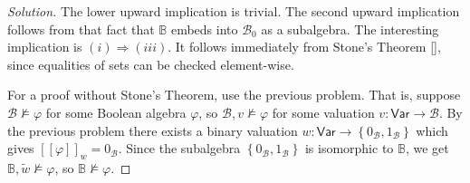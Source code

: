 \begin{proof}[Solution]
    The lower upward implication is trivial. The second upward implication follows from that fact that \( \mathbb{B} \) embeds into \( \mathcal{B}_0 \) as a subalgebra. The interesting implication is \( (i) \Rightarrow (iii) \). It follows immediately from Stone's Theorem \ref{}, since equalities of sets can be checked element-wise. 

    For a proof without Stone's Theorem, use the previous problem. That is, suppose \( \mathcal{B} \not\models \varphi \) for some Boolean algebra \( \varphi \), so \( \mathcal{B}, v \not\models \varphi \) for some valuation \( v: \mathsf{Var} \to \mathcal{B} \). By the previous problem there exists a binary valuation \( w: \mathsf{Var} \to \left\{ 0_{ \mathcal{B} }, 1_{ \mathcal{B} } \right\} \) which gives \( \left[ \left[ \varphi \right] \right]_w = 0_{ \mathcal{B} } \). Since the subalgebra \( \left\{ 0_{ \mathcal{B} }, 1_{ \mathcal{B} } \right\}  \) is isomorphic to \( \mathbb{B} \), we get \( \mathbb{B}, \widetilde{w} \not\models \varphi \), so \( \mathbb{B} \not\models \varphi \).
\end{proof}

